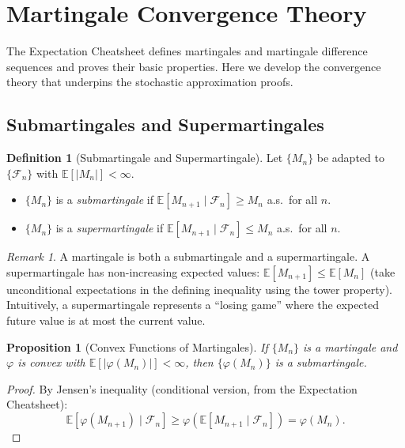 \documentclass[11pt,a4paper]{article}
\theoremstyle{definition}
\newtheorem{definition}{Definition}[section]
\theoremstyle{plain}
\newtheorem{proposition}[theorem]{Proposition}
\theoremstyle{remark}
\newtheorem{remark}{Remark}[section]
\newcommand{\E}{\mathbb{E}}
\begin{document}
\section{Martingale Convergence Theory}
\label{sec:martingale_convergence}

The Expectation Cheatsheet defines martingales and martingale difference sequences and proves their basic properties. Here we develop the convergence theory that underpins the stochastic approximation proofs.

\subsection{Submartingales and Supermartingales}
\label{subsec:sub_super}

\begin{definition}[Submartingale and Supermartingale]
\label{def:sub_super}
Let $\{M_n\}$ be adapted to $\{\mathcal{F}_n\}$ with $\E[|M_n|] < \infty$.
\begin{itemize}[nosep]
    \item $\{M_n\}$ is a \emph{submartingale} if $\E[M_{n+1} \mid \mathcal{F}_n] \geq M_n$ a.s.\ for all $n$.
    \item $\{M_n\}$ is a \emph{supermartingale} if $\E[M_{n+1} \mid \mathcal{F}_n] \leq M_n$ a.s.\ for all $n$.
\end{itemize}
\end{definition}

\begin{remark}
A martingale is both a submartingale and a supermartingale. A supermartingale has non-increasing expected values: $\E[M_{n+1}] \leq \E[M_n]$ (take unconditional expectations in the defining inequality using the tower property). Intuitively, a supermartingale represents a ``losing game'' where the expected future value is at most the current value.
\end{remark}

\begin{proposition}[Convex Functions of Martingales]
\label{prop:convex_martingale}
If $\{M_n\}$ is a martingale and $\varphi$ is convex with $\E[|\varphi(M_n)|] < \infty$, then $\{\varphi(M_n)\}$ is a submartingale.
\end{proposition}

\begin{proof}
By Jensen's inequality (conditional version, from the Expectation Cheatsheet):
\begin{equation}
    \E[\varphi(M_{n+1}) \mid \mathcal{F}_n] \geq \varphi(\E[M_{n+1} \mid \mathcal{F}_n]) = \varphi(M_n).
\end{equation}
\end{proof}
\end{document}

